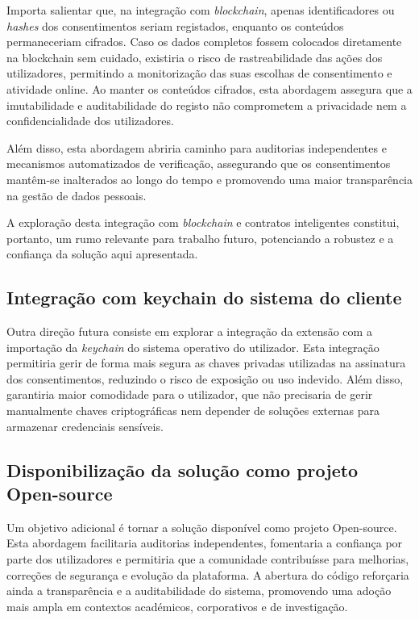 Importa salientar que, na integração com \textit{blockchain}, apenas identificadores ou \textit{hashes} dos consentimentos seriam registados, enquanto os conteúdos permaneceriam cifrados. Caso os dados completos fossem colocados diretamente na blockchain sem cuidado, existiria o risco de rastreabilidade das ações dos utilizadores, permitindo a monitorização das suas escolhas de consentimento e atividade online. Ao manter os conteúdos cifrados, esta abordagem assegura que a imutabilidade e auditabilidade do registo não comprometem a privacidade nem a confidencialidade dos utilizadores.

Além disso, esta abordagem abriria caminho para auditorias independentes e mecanismos automatizados de verificação, assegurando que os consentimentos mantêm-se inalterados ao longo do tempo e promovendo uma maior transparência na gestão de dados pessoais.

A exploração desta integração com \textit{blockchain} e contratos inteligentes constitui, portanto, um rumo relevante para trabalho futuro, potenciando a robustez e a confiança da solução aqui apresentada.

\subsection{Integração com keychain do sistema do cliente}

Outra direção futura consiste em explorar a integração da extensão com a importação da \textit{keychain} do sistema operativo do utilizador. Esta integração permitiria gerir de forma mais segura as chaves privadas utilizadas na assinatura dos consentimentos, reduzindo o risco de exposição ou uso indevido. Além disso, garantiria maior comodidade para o utilizador, que não precisaria de gerir manualmente chaves criptográficas nem depender de soluções externas para armazenar credenciais sensíveis.

\subsection{Disponibilização da solução como projeto Open-source}

Um objetivo adicional é tornar a solução disponível como projeto Open-source. Esta abordagem facilitaria auditorias independentes, fomentaria a confiança por parte dos utilizadores e permitiria que a comunidade contribuísse para melhorias, correções de segurança e evolução da plataforma. A abertura do código reforçaria ainda a transparência e a auditabilidade do sistema, promovendo uma adoção mais ampla em contextos académicos, corporativos e de investigação.
